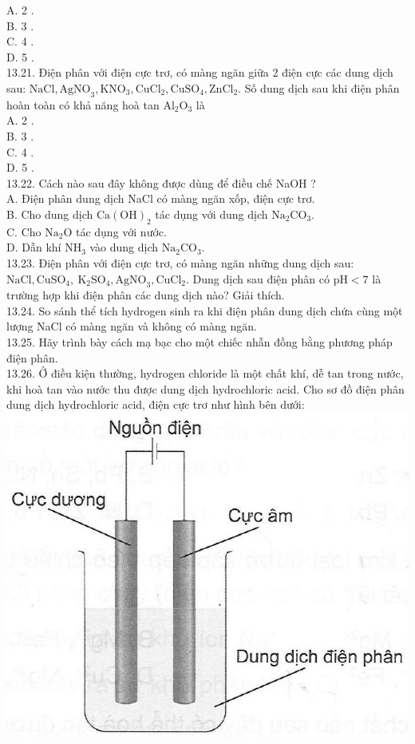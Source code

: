 \documentclass[10pt]{article}
\begin{document}
A. 2 .\\
B. 3 .\\
C. 4 .\\
D. 5 .\\
13.21. Điện phân với điện cực trơ, có màng ngăn giữa 2 điện cực các dung dịch sau: $\mathrm{NaCl}, \mathrm{AgNO}_{3}, \mathrm{KNO}_{3}, \mathrm{CuCl}_{2}, \mathrm{CuSO}_{4}, \mathrm{ZnCl}_{2}$. Số dung dịch sau khi điện phân hoàn toàn có khả năng hoà tan $\mathrm{Al}_{2} \mathrm{O}_{3}$ là\\
A. 2 .\\
B. 3 .\\
C. 4 .\\
D. 5 .\\
13.22. Cách nào sau đây không được dùng để điều chế NaOH ?\\
A. Điện phân dung dịch NaCl có màng ngăn xốp, điện cực trơ.\\
B. Cho dung dịch $\mathrm{Ca}(\mathrm{OH})_{2}$ tác dụng với dung dịch $\mathrm{Na}_{2} \mathrm{CO}_{3}$.\\
C. Cho $\mathrm{Na}_{2} \mathrm{O}$ tác dụng với nước.\\
D. Dẫn khí $\mathrm{NH}_{3}$ vào dung dịch $\mathrm{Na}_{2} \mathrm{CO}_{3}$.\\
13.23. Điện phân với điện cực trơ, có màng ngăn những dung dịch sau: $\mathrm{NaCl}, \mathrm{CuSO}_{4}, \mathrm{~K}_{2} \mathrm{SO}_{4}, \mathrm{AgNO}_{3}, \mathrm{CuCl}_{2}$. Dung dịch sau điện phân có $\mathrm{pH}<7$ là trường hợp khi điện phân các dung dịch nào? Giải thích.\\
13.24. So sánh thể tích hydrogen sinh ra khi điện phân dung dịch chứa cùng một lượng NaCl có màng ngăn và không có màng ngăn.\\
13.25. Hãy trình bày cách mạ bạc cho một chiếc nhẫn đồng bằng phương pháp điện phân.\\
13.26. Ở điều kiện thường, hydrogen chloride là một chất khí, dễ tan trong nước, khi hoà tan vào nước thu được dung dịch hydrochloric acid. Cho sơ đồ điện phân dung dịch hydrochloric acid, điện cực trơ như hình bên dưới:\\
\includegraphics[max width=\textwidth, center]{2025_10_23_de6f5713836e4e91b3c8g-085}\\
\end{document}
